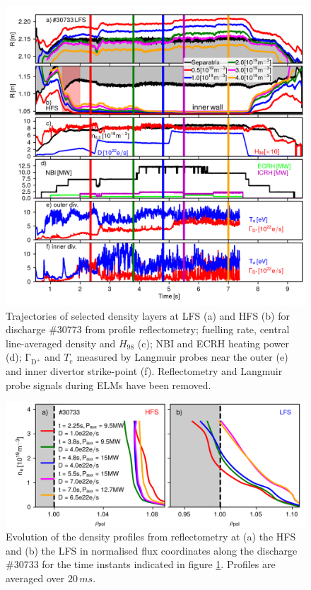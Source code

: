 \documentclass[12pt]{iopart}
\begin{document}
\begin{figure}[!hbt]
\centering
\includegraphics[]{newjsat2_layers_30733.png}
\caption[Overview of discharge \#30733.]{Trajectories of selected density layers at LFS (a) and HFS (b) for discharge \#30773 from profile reflectometry; fuelling rate, central line-averaged density and $H_{98}$ (c); NBI and ECRH heating power (d); $\mathrm{\Gamma_{D^{+}}}$ and $T_e$ measured by Langmuir probes near the outer (e) and inner divertor strike-point (f).
Reflectometry and Langmuir probe signals during ELMs have been removed.}
\label{fig:layers_30733}
\end{figure}

\begin{figure}[!bt]
\centering
\includegraphics[]{testeq.png}
\caption[Density profile evolution for discharge \#30733.]{Evolution of the density profiles from reflectometry at (a) the HFS and (b) the LFS in normalised flux coordinates along the discharge \#30733 for the time instants indicated in figure \ref{fig:layers_30733}. Profiles are averaged over $20\,ms$.}
\label{fig:perfs_30733}
\end{figure}
\end{document}
